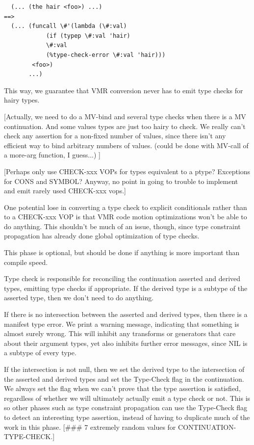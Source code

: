 \begin{verbatim}
  (... (the hair <foo>) ...)
==>
  (... (funcall \#'(lambda (\#:val)
		    (if (typep \#:val 'hair)
			\#:val
			(%type-check-error \#:val 'hair)))
		<foo>)
       ...)
\end{verbatim}
This way, we guarantee that VMR conversion never has to emit type checks for
hairy types.

[Actually, we need to do a MV-bind and several type checks when there is a MV
continuation.  And some values types are just too hairy to check.  We really
can't check any assertion for a non-fixed number of values, since there isn't
any efficient way to bind arbitrary numbers of values.  (could be done with
MV-call of a more-arg function, I guess...)
]

[Perhaps only use CHECK-xxx VOPs for types equivalent to a ptype?  Exceptions
for CONS and SYMBOL?  Anyway, no point in going to trouble to implement and
emit rarely used CHECK-xxx vops.]

One potential lose in converting a type check to explicit conditionals rather
than to a CHECK-xxx VOP is that VMR code motion optimizations won't be able to
do anything.  This shouldn't be much of an issue, though, since type constraint
propagation has already done global optimization of type checks.


This phase is optional, but should be done if anything is more important than
compile speed.  

Type check is responsible for reconciling the continuation asserted and derived
types, emitting type checks if appropriate.  If the derived type is a subtype
of the asserted type, then we don't need to do anything.

If there is no intersection between the asserted and derived types, then there
is a manifest type error.  We print a warning message, indicating that
something is almost surely wrong.  This will inhibit any transforms or
generators that care about their argument types, yet also inhibits further
error messages, since NIL is a subtype of every type.

If the intersection is not null, then we set the derived type to the
intersection of the asserted and derived types and set the Type-Check flag in
the continuation.  We always set the flag when we can't prove that the type
assertion is satisfied, regardless of whether we will ultimately actually emit
a type check or not.  This is so other phases such as type constraint
propagation can use the Type-Check flag to detect an interesting type
assertion, instead of having to duplicate much of the work in this phase.  
[\#\#\# 7 extremely random values for CONTINUATION-TYPE-CHECK.]

